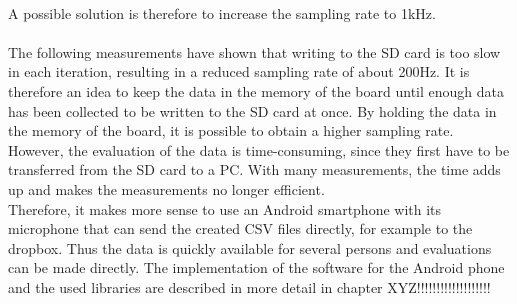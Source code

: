 \\
A possible solution is therefore to increase the sampling rate to 1kHz. 
\\\\
The following measurements have shown that writing to the SD card is too slow in each iteration, resulting in a reduced sampling rate of about 200Hz. It is therefore an idea to keep the data in the memory of the board until enough data has been collected to be written to the SD card at once. 
\newpage
By holding the data in the memory of the board, it is possible to obtain a higher sampling rate. However, the evaluation of the data is time-consuming, since they first have to be transferred from the SD card to a PC. With many measurements, the time adds up and makes the measurements no longer efficient. \\
Therefore, it makes more sense to use an Android smartphone with its microphone that can send the created CSV files directly, for example to the dropbox. Thus the data is quickly available for several persons and evaluations can be made directly. The implementation of the software for the Android phone and the used libraries are described in more detail in chapter XYZ!!!!!!!!!!!!!!!!!!!
